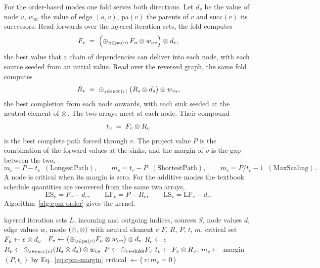 \documentclass[12pt]{report}
\begin{document}
For the order-based modes one fold serves both directions. Let $d_v$ be the value of node
$v$, $w_{uv}$ the value of edge $(u,v)$, $\mathrm{pa}(v)$ the parents of $v$ and
$\mathrm{succ}(v)$ its successors. Read forwards over the layered iteration sets, the fold
computes
\begin{equation}
\label{eq:cpm-forward}
F_v \;=\; \Bigl(\oplus_{u \in \mathrm{pa}(v)} \, F_u \otimes w_{uv}\Bigr) \otimes d_v ,
\end{equation}
the best value that a chain of dependencies can deliver into each node, with each source
seeded from an initial value. Read over the reversed graph, the same fold computes
\begin{equation}
\label{eq:cpm-reverse}
R_v \;=\; \oplus_{s \in \mathrm{succ}(v)} \,\bigl(R_s \otimes d_s\bigr) \otimes w_{vs} ,
\end{equation}
the best completion from each node onwards, with each sink seeded at the neutral element
of $\otimes$. The two arrays meet at each node. Their compound
\begin{equation}
\label{eq:cpm-through}
t_v \;=\; F_v \otimes R_v
\end{equation}
is the best complete path forced through $v$. The project value $P$ is the combination of
the forward values at the sinks, and the margin of $v$ is the gap between the two,
\begin{equation}
\label{eq:cpm-margin}
m_v = P - t_v \;\;(\text{LongestPath}), \qquad
m_v = t_v - P \;\;(\text{ShortestPath}), \qquad
m_v = P / t_v - 1 \;\;(\text{MaxScaling}).
\end{equation}
A node is critical when its margin is zero. For the additive modes the textbook schedule
quantities are recovered from the same two arrays,
\begin{equation}
\label{eq:cpm-schedule}
\mathrm{ES}_v = F_v - d_v, \qquad \mathrm{LF}_v = P - R_v, \qquad \mathrm{LS}_v = \mathrm{LF}_v - d_v .
\end{equation}
Algorithm~\ref{alg:cpm-order} gives the kernel.

\begin{algorithm}[htbp]
\caption{Order-based kernel (one mode)}
\label{alg:cpm-order}
\begin{algorithmic}[1]
\Require layered iteration sets $L$, incoming and outgoing indices, sources $S$, node
  values $d$, edge values $w$, mode $(\oplus, \otimes)$ with neutral element $e$
\Ensure $F$, $R$, $P$, $t$, $m$, critical set
   $F_v \gets e \otimes d_v$
  \Else\ $F_v \gets \bigl(\oplus_{u \in \mathrm{pa}(v)} F_u \otimes w_{uv}\bigr) \otimes d_v$
  \EndIf
\EndFor
{}
   $R_v \gets e$
  \Else\ $R_v \gets \oplus_{s \in \mathrm{succ}(v)} (R_s \otimes d_s) \otimes w_{vs}$
  \EndIf
\EndFor
\State $P \gets \oplus_{v \in \text{sinks}} F_v$
  \State $t_v \gets F_v \otimes R_v$; \quad $m_v \gets$ margin$(P, t_v)$ by Eq.~\eqref{eq:cpm-margin}
\EndFor
\State critical $\gets \{\, v : m_v = 0 \,\}$
\end{algorithmic}
\end{algorithm}
\end{document}

